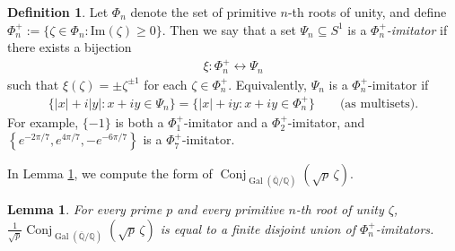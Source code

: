 \documentclass[11pt,letterpaper,reqno]{amsart}
\newtheorem{lemma}[theorem]{Lemma}
\theoremstyle{definition}
\newtheorem{definition}[theorem]{Definition}
\numberwithin{equation}{section}
\numberwithin{figure}{section}
\numberwithin{table}{section}
\newcommand{\lrcb}[1]{\!\left\{#1\right\}}
\newcommand{\QQ}{\mathbb{Q}}
\renewcommand{\Im}{\mathrm{Im}}
\begin{document}
\begin{definition}
    \label{def:phi-n-plus-imitators}
    Let $\Phi_n$ denote the set of primitive $n$-th roots of unity, and define $\Phi_n^+ := \{\zeta \in \Phi_n : \Im(\zeta) \ge 0\}$.
    Then we say that a set $\Psi_n \subseteq S^1$ is a \textit{$\Phi_n^+$-imitator} if there exists a bijection
    \begin{align}
        \xi :\Phi_n^+ \longleftrightarrow \Psi_n
    \end{align}
    such that $\xi(\zeta) = \pm \zeta^{\pm 1}$ for each $\zeta \in \Phi_n^+$. 
    Equivalently, $\Psi_n$ is a $\Phi_n^+$-imitator if
    \begin{align}
        \big\{|x| + i|y| : x+iy \in \Psi_n \big\} 
        = 
        \big\{|x| + iy : x+iy \in \Phi_n^+\big\} 
        \qquad \text{(as multisets)}.
    \end{align}
    For example, $\{-1\}$ is both a $\Phi_1^+$-imitator and a $\Phi_2^+$-imitator, and $\lrcb{e^{-2\pi/7}, e^{4\pi/7}, -e^{-6\pi/7}}$ is a $\Phi_7^+$-imitator.
\end{definition}


In Lemma \ref{lem:conjugates-shape}, we compute the form of $\operatorname{Conj}_{\operatorname{Gal}(\overline{\QQ}/\QQ)}(\sqrt p\,\zeta)$.
\begin{lemma}\label{lem:conjugates-shape}
For every prime $p$ and every
primitive $n$-th root of unity $\zeta$, 
$\frac{1}{\sqrt p} \operatorname{Conj}_{\operatorname{Gal}(\overline{\QQ}/\QQ)}(\sqrt p\,\zeta)$ is equal to a finite disjoint union of $\Phi_n^+$-imitators.
\end{lemma}
\end{document}
